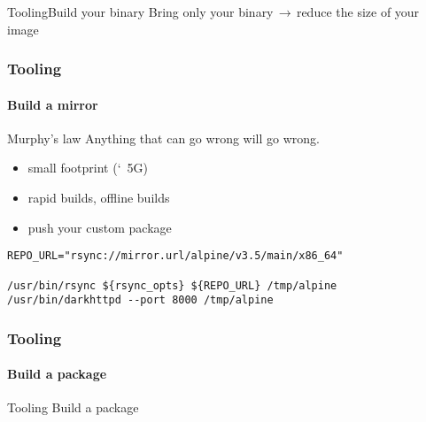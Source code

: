 \documentclass{beamer}
\begin{document}
\begin{frame}{Tooling}{Build your binary}
  Bring only your binary$\,\to\,$reduce the size of your image

\end{frame}

\begin{frame}[fragile]
  \frametitle{Tooling}
  \framesubtitle{Build a mirror}

  \begin{exampleblock}{Murphy's law}
    \vskip2mm
    Anything that can go wrong will go wrong.
    \vskip2mm
  \end{exampleblock}

    \begin{itemize}
    \item small footprint (\char`~5G)
    \item rapid builds, offline builds
    \item push your custom package
  \end{itemize}

  \begin{verbatim}
REPO_URL="rsync://mirror.url/alpine/v3.5/main/x86_64"

/usr/bin/rsync ${rsync_opts} ${REPO_URL} /tmp/alpine
/usr/bin/darkhttpd --port 8000 /tmp/alpine
  \end{verbatim}
\end{frame}

\begin{frame}
  \frametitle{Tooling}
  \framesubtitle{Build a package}

\end{frame}

\begin{frame}{Tooling}
  Build a package
\end{frame}
\end{document}
